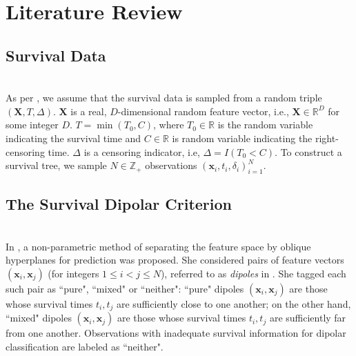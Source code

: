 \documentclass[12pt]{amsart}
\theoremstyle{definition}
\theoremstyle{plain}
\theoremstyle{remark}
\newcommand{\RR}{\mathbb{R}}
\newcommand{\ZZ}{\mathbb{Z}}
\begin{document}
\section{Literature Review} %


\subsection{Survival Data} \hfill \\


As per \cite{kretowska}, we assume that the survival data is sampled from a random triple $(\mathbf{X}, T, \Delta)$. $\mathbf{X}$ is a real, $D$-dimensional random feature vector, i.e., $\mathbf{X} \in \RR^D$ for some integer $D$. $T = \min(T_0, C)$, where $T_0 \in \RR$ is the random variable indicating the survival time and $C \in \RR$ is random variable indicating the right-censoring time. $\Delta$ is a censoring indicator, i.e, $\Delta = I(T_0 < C)$. To construct a survival tree, we sample $N \in \ZZ_+$ observations $(\mathbf{x}_i, t_i, \delta_i)_{i = 1}^N$. 


\subsection{The Survival Dipolar Criterion} \hfill \\


In \cite{kretowska}, a non-parametric method of separating the feature space by oblique hyperplanes for prediction was proposed. She considered pairs of feature vectors $(\mathbf{x}_i, \mathbf{x}_j)$ (for integers $1 \leq i < j \leq N$), referred to as \emph{dipoles} in \cite{bobrowskikretowski}. She tagged each such pair as ``pure", ``mixed" or ``neither": ``pure" dipoles $(\mathbf{x}_i, \mathbf{x}_j)$ are those whose survival times $t_i, t_j$ are sufficiently close to one another; on the other hand, ``mixed" dipoles $(\mathbf{x}_i, \mathbf{x}_j)$ are those whose survival times $t_i, t_j$ are sufficiently far from one another.  Observations with inadequate survival information for dipolar classification are labeled as ``neither". \\
\end{document}
